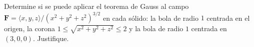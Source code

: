 ﻿Determine si se puede aplicar el teorema de Gauss al campo $\mathbf F=\langle x,y,z\rangle/(x^2+y^2+z^2)^{3/2}$ en cada sólido: la bola de radio $1$ centrada en el origen, la corona $1\leq\sqrt{x^2+y^2+z^2}\leq2$ y la bola de radio $1$ centrada en $(3,0,0)$. Justifique.
